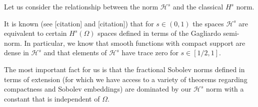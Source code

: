 \documentclass[11pt]{amsart}
\theoremstyle{remark}
\theoremstyle{definition}
\newcommand{\norm}[1]{\left\lVert#1\right\rVert}
\newcommand{\paren}[1]{\left( #1 \right)}
\newcommand{\abs}[1]{\left\lvert #1 \right\rvert}
\DeclareMathOperator{\supp}{supp}
\newcommand{\indic}[1]{\chi_{\{#1\}}}
\newcommand{\HD}{\mathcal{H}}
\newcommand{\Rom}[1]{\MakeUppercase{\romannumeral #1}}
\begin{document}
%
%
%

Let us consider the relationship between the norm $\HD^s$ and the classical $H^s$ norm.  

It is known (see [citation] and [citation]) that for $s \in (0,1)$ the spaces $\HD^s$ are equivalent to certain $H^s(\Omega)$ spaces defined in terms of the Gagliardo semi-norm.  In particular, we know that smooth functions with compact support are dense in $\HD^s$ and that elements of $\HD^s$ have trace zero for $s \in [1/2,1]$.  

The most important fact for us is that the fractional Sobolev norms defined in terms of extension (for which we have access to a variety of theorems regarding compactness and Sobolev embeddings) are dominated by our $\HD^s$ norm with a constant that is independent of $\Omega$.  
\end{document}

